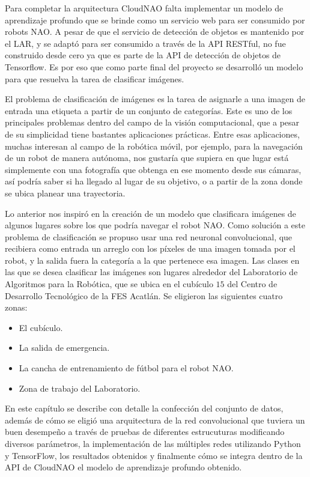 %
%

Para completar la arquitectura CloudNAO falta implementar un modelo de aprendizaje 
profundo que se brinde como un servicio web para ser consumido por robots NAO.
A pesar de que el servicio de detección de objetos es mantenido por el LAR, y 
se adaptó para ser consumido a través de la API RESTful, no fue construido
desde cero ya que es parte de la API de detección de objetos de Tensorflow.
Es por eso que como parte final del proyecto se desarrolló un modelo para que 
resuelva la tarea de clasificar imágenes.

El problema de clasificación de imágenes es la tarea de asignarle a una imagen de
entrada una etiqueta a partir de un conjunto de categorías. Este es uno de los principales
problemas dentro del campo de la visión computacional, que a pesar de su simplicidad
tiene bastantes aplicaciones prácticas. Entre esas aplicaciones, muchas interesan al
campo de la robótica móvil, por ejemplo, para la navegación de un robot de manera
autónoma, nos gustaría que supiera en que lugar está simplemente con una fotografía
que obtenga en ese momento desde sus cámaras, así podría saber si ha llegado al 
lugar de su objetivo, o a partir de la zona donde se ubica planear una trayectoria.

Lo anterior nos inspiró en la creación de un modelo que clasificara imágenes
de algunos lugares sobre los que podría navegar el robot NAO. 
Como solución a este problema de clasificación se propuso usar 
una red neuronal convolucional, que recibiera como entrada un arreglo con los
píxeles de una imagen tomada por el robot, y la salida fuera la categoría
a la que pertenece esa imagen. 
Las clases en las que se desea clasificar las imágenes son lugares alrededor
del Laboratorio de Algoritmos para la Robótica, que se ubica en el cubículo $15$ del
Centro de Desarrollo Tecnológico de la FES Acatlán. Se eligieron las siguientes cuatro zonas:

\begin{itemize}
    \item El cubículo.
    \item La salida de emergencia.
    \item La cancha de entrenamiento de fútbol para el robot NAO.
    \item Zona de trabajo del Laboratorio.
\end{itemize}


En este capítulo se describe con detalle la confección del
conjunto de datos, además de cómo se eligió una arquitectura de la red 
convolucional que tuviera un buen desempeño a través de pruebas
de diferentes estrucuturas modificando diversos parámetros, la implementación
de las múltiples redes utilizando Python y TensorFlow, los resultados obtenidos
y finalmente cómo se integra dentro de la API de CloudNAO el modelo
de aprendizaje profundo obtenido.

%
%